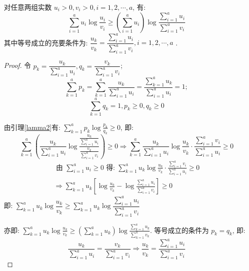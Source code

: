 \begin{lemma}\label{lamma3}
 对任意两组实数 $ u_{i}>0, v_{i}>0, i=1,2, \cdots, a $, 有:
$$
\sum_{i=1}^{a} u_{i} \log \frac{u_{i}}{v_{i}} \geqslant\left(\sum_{i=1}^{a} u_{i}\right) \log \frac{\sum\limits_{i=1}^{a} u_{i}}{\sum\limits_{i=1}^{a} v_{i}}
$$
其中等号成立的充要条件为: $ \dfrac{u_{k}}{v_{k}}=\dfrac{\sum\limits_{i=1}^{a} u_{i}}{\sum\limits_{i=1}^{a} v_{i}}, i=1,2, \cdots, a $ .

\end{lemma}
\begin{proof}
  令 $ p_{k}=\dfrac{u_{k}}{\sum\limits_{i=1}^{a} u_{i}}, q_{k}=\dfrac{v_{k}}{\sum\limits_{i=1}^{a} v_{i}} $;
$$
\sum_{k=1}^{a} p_{k}=\sum_{k=1}^{a} \frac{u_{k}}{\sum\limits_{i=1}^{a} u_{i}}=\frac{\sum\limits_{k=1}^{a} u_{k}}{\sum\limits_{i=1}^{a} u_{i}}=1 ; $$
$$
\sum_{k=1}^{a} q_{k}=1, p_{k} \geqslant 0, q_{k} \geqslant 0 
$$

由引理\ref{lamma2}有: $ \sum\limits_{k=1}^{a} p_{k} \log \frac{p_{k}}{q_{k}} \geqslant 0 $, 即:
$$
\sum_{k=1}^{a}\left(\frac{u_{k}}{\sum\limits_{i=1}^{a} u_{i}} \log \dfrac{\frac{u_{k}}{\sum\limits_{i=1}^{a} u_{i}}}{\frac{v_{k}}{\sum\limits_{i=1}^{a} v_{i}}}\right) \geqslant 0 \Rightarrow \sum_{k=1}^{a} \frac{u_{k}}{\sum\limits_{i=1}^{a} u_{i}} \log \frac{u_{k}}{v_{k}} \cdot \frac{\sum\limits_{i=1}^{a} v_{i}}{\sum\limits_{i=1}^{a} u_{i}} \geqslant 0
$$
$$
\begin{aligned}
\text { 由 } \sum_{i=1}^{a} u_{i} \geqslant 0 \text { 得: } \sum_{k=1}^{a} u_{k} \log \frac{u_{k}}{v_{k}} \cdot \frac{\sum\limits_{i=1}^{a} v_{i}}{\sum\limits_{i=1}^{a} u_{i}} \geqslant 0 \\
\Rightarrow \sum_{k=1}^{a} u_{k}\left[\log \frac{u_{k}}{v_{k}}-\log \frac{\sum\limits_{i=1}^{a} u_{i}}{\sum\limits_{i=1}^{a} v_{i}}\right] \geqslant 0
\end{aligned}
$$
即: $ \sum\limits_{k=1}^{a} u_{k} \log \dfrac{u_{k}}{v_{k}} \geqslant \sum\limits_{k=1}^{a} u_{k} \log \dfrac{\sum\limits_{i=1}^{a} u_{i}}{\sum\limits_{i=1}^{a} v_{i}} $

亦即: $ \sum\limits_{k=1}^{a} u_{k} \log \frac{u_{k}}{v_{k}} \geqslant\left(\sum\limits_{k=1}^{a} u_{k}\right) \log \frac{\sum\limits_{k=1}^{a} u_{k}}{\sum\limits_{k=1}^{a} v_{k}} $.
等号成立的条件为 $ p_{k}=q_{k} $, 即:
$$
\frac{u_{k}}{\sum\limits_{i=1}^{a} u_{i}}=\frac{v_{k}}{\sum\limits_{i=1}^{a} v_{i}} \Rightarrow \frac{u_{k}}{v_{k}}=\frac{\sum\limits_{i=1}^{a} u_{i}}{\sum\limits_{i=1}^{a} v_{i}}
$$
\end{proof}


